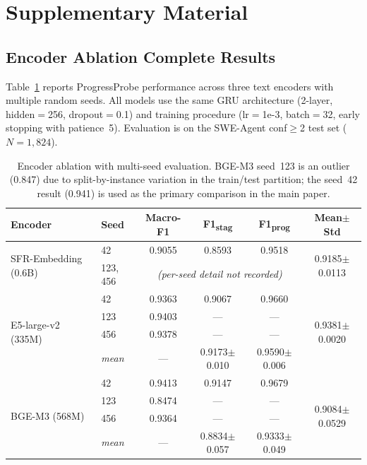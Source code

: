
\appendix

\section{Supplementary Material}
\label{sec:appendix}

\subsection{Encoder Ablation Complete Results}
\label{sec:app_encoder}

Table~\ref{tab:encoder_ablation_full} reports ProgressProbe performance across three text encoders with multiple random seeds.
All models use the same GRU architecture (2-layer, hidden$=$256, dropout$=$0.1) and training procedure (lr$=$1e-3, batch$=$32, early stopping with patience~5).
Evaluation is on the SWE-Agent conf${\geq}$2 test set ($N{=}1{,}824$).

\begin{table}[h]
\centering
\small
\begin{tabular}{llcccc}
\toprule
\textbf{Encoder} & \textbf{Seed} & \textbf{Macro-F1} & \textbf{F1\textsubscript{stag}} & \textbf{F1\textsubscript{prog}} & \textbf{Mean$\pm$Std} \\
\midrule
\multirow{2}{*}{SFR-Embedding (0.6B)} & 42 & 0.9055 & 0.8593 & 0.9518 & \multirow{2}{*}{0.9185$\pm$0.0113} \\
                                       & 123, 456 & \multicolumn{3}{c}{\emph{(per-seed detail not recorded)}} & \\
\midrule
\multirow{4}{*}{E5-large-v2 (335M)}   & 42  & 0.9363 & 0.9067 & 0.9660 & \multirow{4}{*}{0.9381$\pm$0.0020} \\
                                       & 123 & 0.9403 & --- & --- & \\
                                       & 456 & 0.9378 & --- & --- & \\
                                       & \emph{mean} & --- & 0.9173$\pm$0.010 & 0.9590$\pm$0.006 & \\
\midrule
\multirow{4}{*}{BGE-M3 (568M)}        & 42  & 0.9413 & 0.9147 & 0.9679 & \multirow{4}{*}{0.9084$\pm$0.0529} \\
                                       & 123 & 0.8474 & --- & --- & \\
                                       & 456 & 0.9364 & --- & --- & \\
                                       & \emph{mean} & --- & 0.8834$\pm$0.057 & 0.9333$\pm$0.049 & \\
\bottomrule
\end{tabular}
\caption{Encoder ablation with multi-seed evaluation. BGE-M3 seed~123 is an outlier (0.847) due to split-by-instance variation in the train/test partition; the seed~42 result (0.941) is used as the primary comparison in the main paper.}
\label{tab:encoder_ablation_full}
\end{table}

